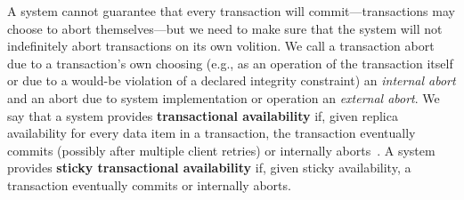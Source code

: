 A system cannot guarantee that every transaction will
commit---transactions may choose to abort themselves---but we need to
make sure that the system will not indefinitely abort transactions on
its own volition. We call a transaction abort due to a transaction's
own choosing (e.g., as an operation of the transaction itself or due
to a would-be violation of a declared integrity constraint) an
\textit{internal abort} and an abort due to system implementation or
operation an \textit{external abort}. We say that a system provides
\textbf{transactional availability} if, given replica availability for
every data item in a transaction, the transaction eventually commits
(possibly after multiple client retries) or internally
aborts~\cite{hat-hotos}. A system provides \textbf{sticky
  transactional availability} if, given sticky availability, a
transaction eventually commits or internally aborts.

